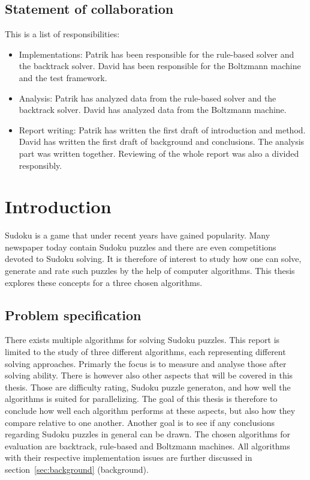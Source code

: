 \documentclass[a4paper,11pt]{kth-mag}
\begin{document}
\section{Statement of collaboration}
This is a list of responsibilities:
\begin{itemize}
    \item Implementations: Patrik has been responsible for the rule-based solver and the backtrack solver. David has been responsible for the Boltzmann machine and the test framework.
    \item Analysis: Patrik has analyzed data from the rule-based solver and the backtrack solver. David has analyzed data from the Boltzmann machine.
    \item Report writing: Patrik has written the first draft of introduction and method. David has written the first draft of background and conclusions. The analysis part was written together. Reviewing of the whole report was also a divided responsibly.
\end{itemize}

\clearpage
\tableofcontents*
\mainmatter
\pagestyle{newchap}

\chapter{Introduction}
Sudoku is a game that under recent years have gained popularity.
Many newspaper today contain Sudoku puzzles and there are even competitions devoted to Sudoku solving.
It is therefore of interest to study how one can solve, generate and rate such puzzles by the help of computer algorithms. This thesis explores these concepts for a three chosen algorithms.

\FloatBarrier
\section{Problem specification}
There exists multiple algorithms for solving Sudoku puzzles.
This report is limited to the study of three different algorithms, each representing different solving approaches.
Primarly the focus is to measure and analyse those after solving ability.
There is however also other aspects that will be covered in this thesis.
Those are difficulty rating, Sudoku puzzle generaton, and how well the algorithms is suited for parallelizing.
The goal of this thesis is therefore to conclude how well each algorithm performs at these aspects, but also how they compare relative to one another.
Another goal is to see if any conclusions regarding Sudoku puzzles in general can be drawn.
The chosen algorithms for evaluation are backtrack, rule-based and Boltzmann machines.
All algorithms with their respective implementation issues are further discussed in section~\ref{sec:background} (background).
\end{document}
